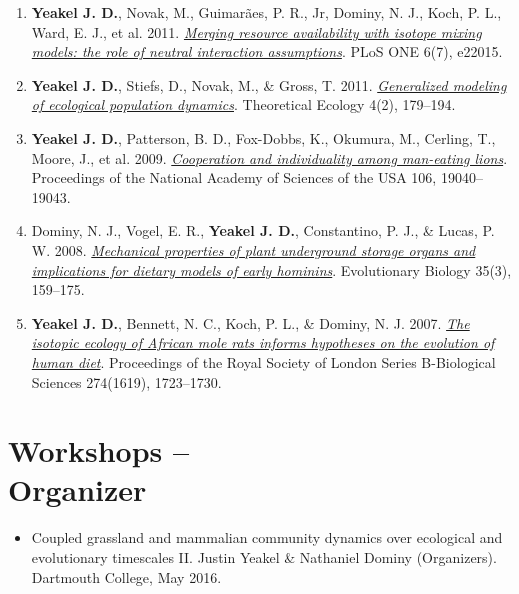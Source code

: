 \documentclass[margin,line,12pt]{res}
\begin{document}
\begin{resume}
\begin{enumerate}
\item \textbf{Yeakel J. D.}, Novak, M., Guimar\~aes, P. R., Jr, Dominy, N. J., Koch, P. L., Ward, E. J., et al. 2011. \href{https://journals.plos.org/plosone/article?id=10.1371/journal.pone.0022015}{\emph{Merging resource availability with isotope mixing models: the role of neutral interaction assumptions}}. PLoS ONE 6(7), e22015.

\item \textbf{Yeakel J. D.}, Stiefs, D., Novak, M., \& Gross, T. 2011. \href{https://link.springer.com/article/10.1007/s12080-011-0112-6}{\emph{Generalized modeling of ecological population dynamics}}. Theoretical Ecology 4(2), 179–194.

\item \textbf{Yeakel J. D.}, Patterson, B. D., Fox-Dobbs, K., Okumura, M., Cerling, T., Moore, J., et al. 2009. \href{https://www.pnas.org/content/106/45/19040}{\emph{Cooperation and individuality among man-eating lions}}. Proceedings of the National Academy of Sciences of the USA 106, 19040–19043.

\item Dominy, N. J., Vogel, E. R., \textbf{Yeakel J. D.}, Constantino, P. J., \& Lucas, P. W. 2008. \href{https://link.springer.com/article/10.1007/s11692-008-9026-7}{\emph{Mechanical properties of plant underground storage organs and implications for dietary models of early hominins}}. Evolutionary Biology 35(3), 159–175.

\item \textbf{Yeakel J. D.}, Bennett, N. C., Koch, P. L., \& Dominy, N. J. 2007. \href{https://royalsocietypublishing.org/doi/10.1098/rspb.2007.0330}{\emph{The isotopic ecology of African mole rats informs hypotheses on the evolution of human diet}}. Proceedings of the Royal Society of London Series B-Biological Sciences 274(1619), 1723–1730.

\end{enumerate}

%
%


\section{\sc Workshops -- \\ Organizer}
\begin{itemize}
\item Coupled grassland and mammalian community dynamics over ecological and evolutionary timescales II. Justin Yeakel \& Nathaniel Dominy (Organizers). Dartmouth College, May 2016.


\end{itemize}
\end{resume}
\end{document}
